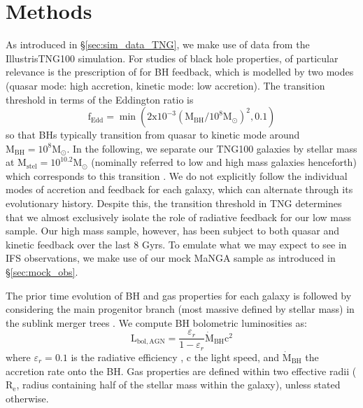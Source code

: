 \section{Methods} \label{sec:methods_BH}
As introduced in \S\ref{sec:sim_data_TNG}, we make use of data from the IllustrisTNG100 simulation. For studies of black hole properties, of particular relevance is the prescription of \citet{weinberger17} for BH feedback, which is modelled by two modes (quasar mode: high accretion, kinetic mode: low accretion). The transition threshold in terms of the Eddington ratio is 
\begin{equation}
\mathrm{f_{Edd}= \min ( 2x10^{-3}(M_{BH}/10^8 M_{\odot})^2 , 0.1)}
\end{equation}
so that BHs typically transition from quasar to kinetic mode around $\mathrm{M_{BH} = 10^{8}M_{\odot}}$. In the following, we separate our TNG100 galaxies by stellar mass at $\mathrm{M_{stel} = 10^{10.2}M_{\odot}}$ (nominally referred to low and high mass galaxies henceforth) which corresponds to this transition \citep[i.e. $\mathrm{M_{BH} \approx 10^{8}M_{\odot}}$, see Fig 1 in][]{li2019}. We do not explicitly follow the individual modes of accretion and feedback for each galaxy, which can alternate through its evolutionary history. Despite this, the transition threshold in TNG determines that we almost exclusively isolate the role of radiative feedback for our low mass sample. Our high mass sample, however, has been subject to both quasar and kinetic feedback over the last 8 Gyrs. To emulate what we may expect to see in IFS observations, we make use of our mock MaNGA sample as introduced in \S\ref{sec:mock_obs}.

 The prior time evolution of BH and gas properties for each galaxy is followed by considering the main progenitor branch (most massive defined by stellar mass) in the sublink merger trees \citep{rgomez2015}. We compute BH bolometric luminosities as:
\begin{equation}
\mathrm{L_{bol, AGN}} = \frac{\varepsilon_r}{1 - \varepsilon_r} \dot{\mathrm{M}}_{\mathrm{BH}} \mathrm{c^2}
\end{equation}
where $\varepsilon_r=0.1$ is the radiative efficiency \citep[see discussion in][]{habouzit2019}, c the light speed, and $\dot{\mathrm{M}}_{\mathrm{BH}}$ the accretion rate onto the BH. Gas properties are defined within two effective radii ($\mathrm{R_{e}}$, radius containing half of the stellar mass within the galaxy), unless stated otherwise.

